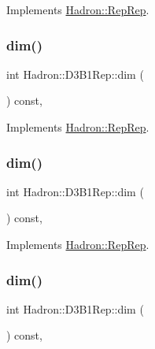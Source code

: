 Implements \mbox{\hyperlink{structHadron_1_1RepRep_a92c8802e5ed7afd7da43ccfd5b7cd92b}{Hadron\+::\+Rep\+Rep}}.

\mbox{\label{structHadron_1_1D3B1Rep_ae0ea1d6f2720000159957d1303038399}} 
\subsubsection{\texorpdfstring{dim()}{dim()}\hspace{0.1cm}{\footnotesize\ttfamily [3/5]}}
{\footnotesize\ttfamily int Hadron\+::\+D3\+B1\+Rep\+::dim (\begin{DoxyParamCaption}{ }\end{DoxyParamCaption}) const\hspace{0.3cm}{\ttfamily [inline]}, {\ttfamily [virtual]}}



Implements \mbox{\hyperlink{structHadron_1_1RepRep_a92c8802e5ed7afd7da43ccfd5b7cd92b}{Hadron\+::\+Rep\+Rep}}.

\mbox{\label{structHadron_1_1D3B1Rep_ae0ea1d6f2720000159957d1303038399}} 
\subsubsection{\texorpdfstring{dim()}{dim()}\hspace{0.1cm}{\footnotesize\ttfamily [4/5]}}
{\footnotesize\ttfamily int Hadron\+::\+D3\+B1\+Rep\+::dim (\begin{DoxyParamCaption}{ }\end{DoxyParamCaption}) const\hspace{0.3cm}{\ttfamily [inline]}, {\ttfamily [virtual]}}



Implements \mbox{\hyperlink{structHadron_1_1RepRep_a92c8802e5ed7afd7da43ccfd5b7cd92b}{Hadron\+::\+Rep\+Rep}}.

\mbox{\label{structHadron_1_1D3B1Rep_ae0ea1d6f2720000159957d1303038399}} 
\subsubsection{\texorpdfstring{dim()}{dim()}\hspace{0.1cm}{\footnotesize\ttfamily [5/5]}}
{\footnotesize\ttfamily int Hadron\+::\+D3\+B1\+Rep\+::dim (\begin{DoxyParamCaption}{ }\end{DoxyParamCaption}) const\hspace{0.3cm}{\ttfamily [inline]}, {\ttfamily [virtual]}}



